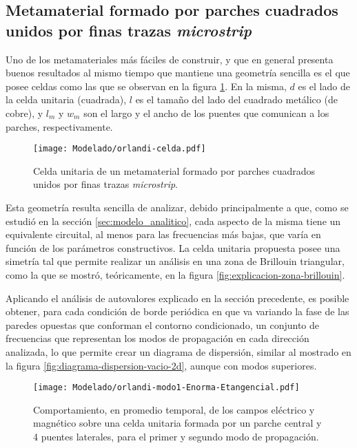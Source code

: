 \subsection{Metamaterial formado por parches cuadrados unidos por finas trazas \textit{microstrip}}
\label{sec:celdas-orlandi}

Uno de los metamateriales más fáciles de construir, y que en general presenta buenos resultados al mismo tiempo que mantiene una geometría sencilla es el que posee celdas como las que se observan en la figura \ref{fig:celda-orlandi}. En la misma, $d$ es el lado de la celda unitaria (cuadrada), $l$ es el tamaño del lado del cuadrado metálico (de cobre), y $l_m$ y $w_m$ son el largo y el ancho de los puentes que comunican a los parches, respectivamente.

\begin{figure}[h]
	\centering
	\texttt{[image: Modelado/orlandi-celda.pdf]}
	\caption{Celda unitaria de un metamaterial formado por parches cuadrados unidos por finas trazas \textit{microstrip}.}
	\label{fig:celda-orlandi}
\end{figure}

Esta geometría resulta sencilla de analizar, debido principalmente a que, como se estudió en la sección \ref{sec:modelo_analitico}, cada aspecto de la misma tiene un equivalente circuital, al menos para las frecuencias más bajas, que varía en función de los parámetros constructivos. La celda unitaria propuesta posee una simetría tal que permite realizar un análisis en una zona de Brillouin triangular, como la que se mostró, teóricamente, en la figura \ref{fig:explicacion-zona-brillouin}.

Aplicando el análisis de autovalores explicado en la sección precedente, es posible obtener, para cada condición de borde periódica en que va variando la fase de las paredes opuestas que conforman el contorno condicionado, un conjunto de frecuencias que representan los modos de propagación en cada dirección analizada, lo que permite crear un diagrama de dispersión, similar al mostrado en la figura \ref{fig:diagrama-dispersion-vacio-2d}, aunque con modos superiores.

\begin{figure}[h]
	\centering
	\texttt{[image: Modelado/orlandi-modo1-Enorma-Etangencial.pdf]}
	\caption{Comportamiento, en promedio temporal, de los campos eléctrico y magnético sobre una celda unitaria formada por un parche central y 4 puentes laterales, para el primer y segundo modo de propagación.}
	\label{fig:orlandi-analisis-campos}
\end{figure}


